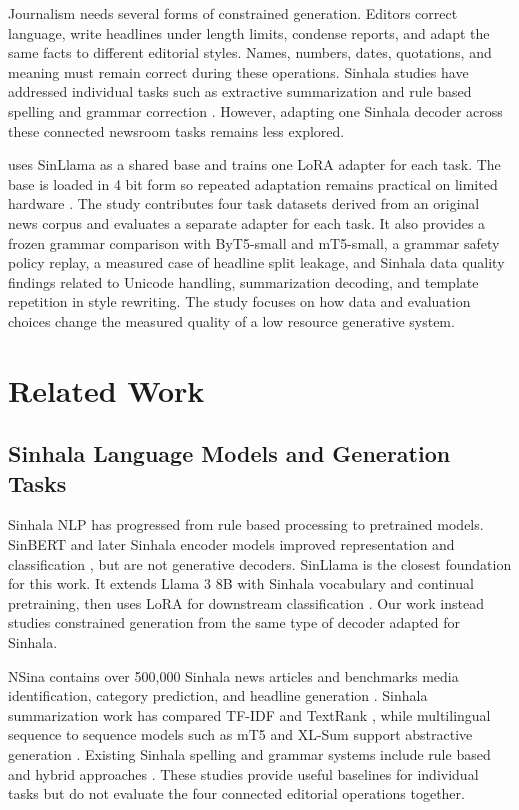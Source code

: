\documentclass[a4paper,conference]{IEEEtran}
\begin{document}
Journalism needs several forms of constrained generation. Editors correct
language, write headlines under length limits, condense reports, and adapt the
same facts to different editorial styles. Names, numbers, dates, quotations,
and meaning must remain correct during these operations. Sinhala studies have
addressed individual tasks such as extractive summarization
\cite{jahan2023summarization} and rule based spelling and grammar correction
\cite{goonawardena2022grammar}. However, adapting one Sinhala decoder across
these connected newsroom tasks remains less explored.

\systemname{} uses SinLlama as a shared base and trains one LoRA adapter
\cite{hu2022lora} for each task. The base is loaded in 4 bit form so repeated
adaptation remains practical on limited hardware \cite{dettmers2023qlora}.
The study contributes four task datasets derived from an original news corpus
and evaluates a separate adapter for each task. It also provides a frozen
grammar comparison with ByT5-small and mT5-small, a grammar safety policy
replay, a measured case of headline split leakage, and Sinhala data quality
findings related to Unicode handling, summarization decoding, and template
repetition in style rewriting. The study focuses on how data and evaluation
choices change the measured quality of a low resource generative system.

\section{Related Work}

\subsection{Sinhala Language Models and Generation Tasks}
Sinhala NLP has progressed from rule based processing to pretrained models.
SinBERT and later Sinhala encoder models improved representation and
classification \cite{dhananjaya2022bertifying,ranasinghe2025encoder}, but are
not generative decoders. SinLlama is the closest foundation for this work.
It extends Llama 3 8B with Sinhala vocabulary and continual pretraining, then
uses LoRA for downstream classification \cite{aravinda2025sinllama}. Our work
instead studies constrained generation from the same type of decoder adapted for Sinhala.

NSina contains over 500,000 Sinhala news articles and benchmarks media
identification, category prediction, and headline generation
\cite{hettiarachchi2024nsina}. Sinhala summarization work has compared TF-IDF
and TextRank \cite{jahan2023summarization}, while multilingual sequence to sequence models such as mT5 and XL-Sum support abstractive generation
\cite{xue2021mt5,hasan2021xlsum}. Existing Sinhala spelling and grammar systems include rule based and hybrid
approaches \cite{goonawardena2022grammar}.
These studies provide useful baselines for individual tasks but do not evaluate the four
connected editorial operations together.
\end{document}
